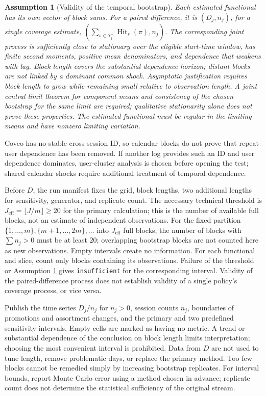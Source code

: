 \documentclass[12pt,a4paper]{article}
\newcommand{\code}[1]{{\ttfamily\small\nolinkurl{#1}}}
\theoremstyle{plainru}
\newtheorem{assumption}{Assumption}[section]
\begin{document}
\begin{assumption}[Validity of the temporal bootstrap]
\label{ass:eval-block-dependence}
Each estimated functional has its own vector of block sums.
For a paired difference, it is $(D_j,n_j)$; for a single coverage estimate,
$(\sum_{s\in\mathcal S_j^+}\operatorname{Hit}_s(\pi),n_j)$.
The corresponding joint process is sufficiently close to stationary
over the eligible start-time window, has finite second moments,
positive mean denominators, and dependence that weakens with lag.
Block length covers the substantial dependence horizon; distant
blocks are not linked by a dominant common shock. Asymptotic justification
requires block length to grow while remaining small relative to observation length.
A joint central limit theorem for component means
and consistency of the chosen bootstrap for the same limit are required;
qualitative stationarity alone does not prove these properties.
The estimated functional must be regular in the limiting means
and have nonzero limiting variation.
\end{assumption}
Coveo has no stable cross-session ID, so calendar blocks
do not prove that repeat-user dependence has been removed.
If another log provides such an ID and user dependence
dominates, user-cluster analysis is chosen before opening the test;
shared calendar shocks require additional treatment of temporal dependence.

Before $D$, the run manifest fixes the grid, block lengths, two additional
lengths for sensitivity, generator, and replicate count.
The necessary technical threshold is
$J_{\mathrm{eff}}=\lfloor J/m\rfloor\ge20$ for the primary calculation;
this is the number of available full blocks, not an estimate of independent observations.
For the fixed partition $\{1,\ldots,m\},\{m+1,\ldots,2m\},\ldots$
into $J_{\mathrm{eff}}$ full blocks, the number of blocks with $\sum n_j>0$
must be at least 20; overlapping bootstrap blocks
are not counted here as new observations. Empty intervals create no information.
For each functional and slice, count only blocks containing its
observations. Failure of the threshold or Assumption
\ref{ass:eval-block-dependence} gives \code{insufficient} for the corresponding
interval. Validity of the paired-difference process does not establish
validity of a single policy's coverage process, or vice versa.

Publish the time series $D_j/n_j$ for $n_j>0$, session counts $n_j$,
boundaries of promotions and assortment changes, and the primary and two predefined
sensitivity intervals. Empty cells are marked as having no
metric. A trend or substantial dependence of the conclusion on block length
limits interpretation; choosing the most convenient interval is prohibited.
Data from $D$ are not used to tune length, remove problematic days,
or replace the primary method. Too few blocks cannot be remedied
simply by increasing bootstrap replicates.
For interval bounds, report Monte Carlo error
using a method chosen in advance; replicate count does not determine
the statistical sufficiency of the original stream.
\end{document}
